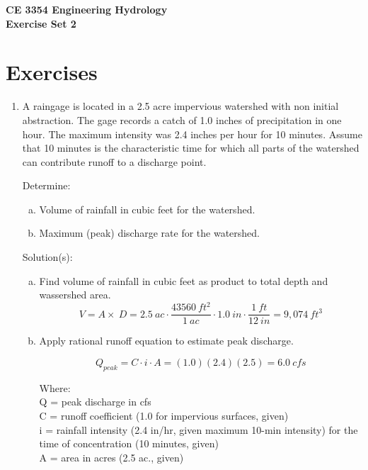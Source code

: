 \documentclass[12pt]{article}
\begin{document}
\begin{center}
{\textbf{{ CE 3354 Engineering Hydrology} \\ {Exercise Set 2}}}
\end{center}

\section*{\small{Exercises}}
\begin{enumerate}
\item A raingage is located in a 2.5 acre impervious watershed with non initial abstraction.  The gage records a catch of 1.0 inches of precipitation in one hour.  The maximum intensity was 2.4 inches per hour for 10 minutes.  Assume that 10 minutes is the characteristic time for which all parts of the watershed can contribute runoff to a discharge point.

Determine:
    \begin{enumerate}[a)]
        \item Volume of rainfall in cubic feet for the watershed. 
        \item Maximum (peak) discharge rate for the watershed.
    \end{enumerate}
Solution(s):


\begin{enumerate}[a)]
\item Find volume of rainfall in cubic feet as product to total depth and wassershed area.
\begin{equation}
V=A \times\ D = 2.5~ac \cdot \frac{43560~ft^2}{1~ac} \cdot 1.0~in \cdot \frac{1~ft}{12~in} = 9,074~ft^3
\end{equation}
\item Apply rational runoff equation to estimate peak discharge.

\begin{equation}
Q_{peak} = C \cdot i\cdot A = (1.0)(2.4)(2.5) = 6.0~cfs
\end{equation}

Where:\\
Q = peak discharge in cfs\\
C = runoff coefficient (1.0 for impervious surfaces, given)\\
i = rainfall intensity (2.4 in/hr, given maximum 10-min intensity) for the time of concentration (10 minutes, given)\\
A = area in acres (2.5 ac., given)\\


\end{enumerate}
\end{enumerate}
\end{document}
